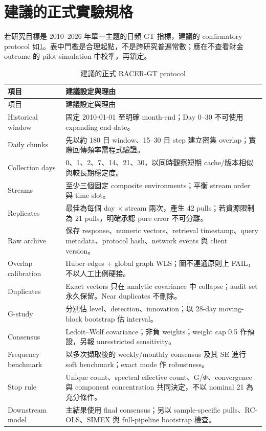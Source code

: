 \documentclass[12pt,a4paper,oneside]{article}
\begin{document}
\section{建議的正式實驗規格}

若研究目標是 2010--2026 年單一主題的日頻 GT 指標，建議的 confirmatory protocol 如\cref{tab:recommended}。表中門檻是合理起點，不是跨研究普遍常數；應在不查看財金 outcome 的 pilot simulation 中校準，再鎖定。

\begin{longtable}{p{4.8cm}p{9.1cm}}
\caption{建議的正式 RACER-GT protocol}\label{tab:recommended}\\
\toprule
項目 & 建議設定與理由\\
\midrule
\endfirsthead
\toprule
項目 & 建議設定與理由\\
\midrule
\endhead
Historical window & 固定 2010-01-01 至明確 month-end；Day 0--30 不可使用 expanding end date。\\
Daily chunks & 先以約 180 日 window、15--30 日 step 建立密集 overlap；實際回傳頻率需程式驗證。\\
Collection days & 0、1、2、7、14、21、30，以同時觀察短期 cache/版本相似與較長期穩定度。\\
Streams & 至少三個固定 composite environments；平衡 stream order 與 time slot。\\
Replicates & 最佳為每個 day $\times$ stream 兩次，產生 42 pulls；若資源限制為 21 pulls，明確承認 pure error 不可分離。\\
Raw archive & 保存 response、numeric vectors、retrieval timestamp、query metadata、protocol hash、network events 與 client version。\\
Overlap calibration & Huber edges + global graph WLS；圖不連通原則上 FAIL，不以人工比例硬接。\\
Duplicates & Exact vectors 只在 analytic covariance 中 collapse；audit set 永久保留。Near duplicates 不刪除。\\
G-study & 分別估 level、detection、innovation；以 28-day moving-block bootstrap 估 interval。\\
Consensus & Ledoit--Wolf covariance；非負 weights；weight cap 0.5 作預設，另報 unrestricted sensitivity。\\
Frequency benchmark & 以多次擷取後的 weekly/monthly consensus 及其 SE 進行 soft benchmark；exact mode 作 robustness。\\
Stop rule & Unique count、spectral effective count、G/$\Phi$、convergence 與 component concentration 共同決定，不以 nominal 21 為充分條件。\\
Downstream model & 主結果使用 final consensus；另以 sample-specific pulls、RC-OLS、SIMEX 與 full-pipeline bootstrap 檢查。\\
\bottomrule
\end{longtable}
\end{document}
